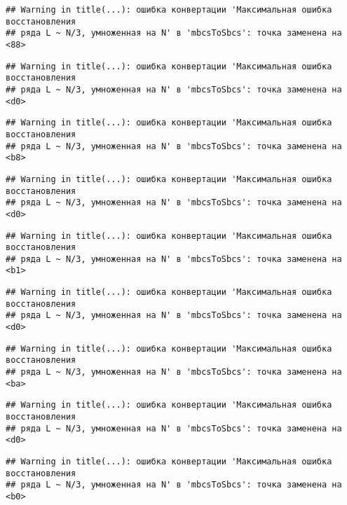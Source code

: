 \documentclass[
]{article}
\begin{document}
\begin{verbatim}
## Warning in title(...): ошибка конвертации 'Максимальная ошибка восстановления
## ряда L ~ N/3, умноженная на N' в 'mbcsToSbcs': точка заменена на <88>
\end{verbatim}

\begin{verbatim}
## Warning in title(...): ошибка конвертации 'Максимальная ошибка восстановления
## ряда L ~ N/3, умноженная на N' в 'mbcsToSbcs': точка заменена на <d0>
\end{verbatim}

\begin{verbatim}
## Warning in title(...): ошибка конвертации 'Максимальная ошибка восстановления
## ряда L ~ N/3, умноженная на N' в 'mbcsToSbcs': точка заменена на <b8>
\end{verbatim}

\begin{verbatim}
## Warning in title(...): ошибка конвертации 'Максимальная ошибка восстановления
## ряда L ~ N/3, умноженная на N' в 'mbcsToSbcs': точка заменена на <d0>
\end{verbatim}

\begin{verbatim}
## Warning in title(...): ошибка конвертации 'Максимальная ошибка восстановления
## ряда L ~ N/3, умноженная на N' в 'mbcsToSbcs': точка заменена на <b1>
\end{verbatim}

\begin{verbatim}
## Warning in title(...): ошибка конвертации 'Максимальная ошибка восстановления
## ряда L ~ N/3, умноженная на N' в 'mbcsToSbcs': точка заменена на <d0>
\end{verbatim}

\begin{verbatim}
## Warning in title(...): ошибка конвертации 'Максимальная ошибка восстановления
## ряда L ~ N/3, умноженная на N' в 'mbcsToSbcs': точка заменена на <ba>
\end{verbatim}

\begin{verbatim}
## Warning in title(...): ошибка конвертации 'Максимальная ошибка восстановления
## ряда L ~ N/3, умноженная на N' в 'mbcsToSbcs': точка заменена на <d0>
\end{verbatim}

\begin{verbatim}
## Warning in title(...): ошибка конвертации 'Максимальная ошибка восстановления
## ряда L ~ N/3, умноженная на N' в 'mbcsToSbcs': точка заменена на <b0>
\end{verbatim}
\end{document}
